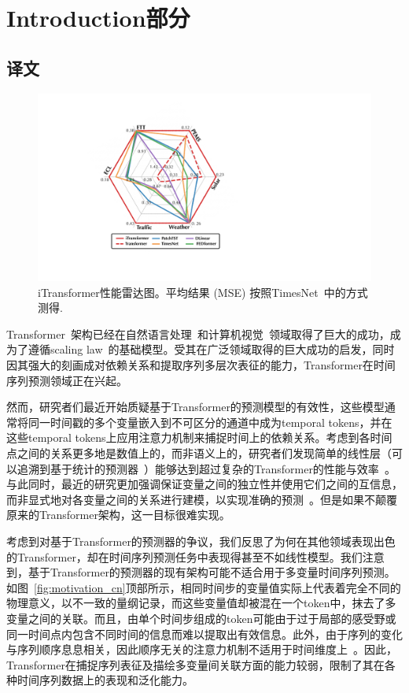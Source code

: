 \documentclass[twoside,12pt]{article}
\begin{document}
\section{Introduction部分}
\subsection{译文}
\begin{figure}[t]
  \begin{center}
    \includegraphics[width=0.5\columnwidth]{pic/radar.pdf}
    \vspace{-10pt}
    \caption{\small{iTransformer性能雷达图。平均结果 (MSE) 按照TimesNet~\citeyearpar{Timesnet}中的方式测得}.}
    \label{fig:radar_cn}
  \end{center}
  \vspace{-14pt}
\end{figure}

Transformer~\citep{Transformer}架构已经在自然语言处理~\citep{brown2020language}和计算机视觉~\citep{dosovitskiy2020image}领域取得了巨大的成功，成为了遵循scaling law~\citep{kaplan2020scaling}的基础模型。受其在广泛领域取得的巨大成功的启发，同时因其强大的刻画成对依赖关系和提取序列多层次表征的能力，Transformer在时间序列预测领域正在兴起。~\citep{Informer, Autoformer, PatchTST}

然而，研究者们最近开始质疑基于Transformer的预测模型的有效性，这些模型通常将同一时间戳的多个变量嵌入到不可区分的通道中成为temporal tokens，并在这些temporal tokens上应用注意力机制来捕捉时间上的依赖关系。考虑到各时间点之间的关系更多地是数值上的，而非语义上的，研究者们发现简单的线性层（可以追溯到基于统计的预测器~\citep{box1968some}）能够达到超过复杂的Transformer的性能与效率~\citep{DLinear, das2023long}。与此同时，最近的研究更加强调保证变量之间的独立性并使用它们之间的互信息，而非显式地对各变量之间的关系进行建模，以实现准确的预测~\citep{DLinear, das2023long}。但是如果不颠覆原来的Transformer架构，这一目标很难实现。

考虑到对基于Transformer的预测器的争议，我们反思了为何在其他领域表现出色的Transformer，却在时间序列预测任务中表现得甚至不如线性模型。我们注意到，基于Transformer的预测器的现有架构可能不适合用于多变量时间序列预测。如图~\ref{fig:motivation_cn}顶部所示，相同时间步的变量值实际上代表着完全不同的物理意义，以不一致的量纲记录，而这些变量值却被混在一个token中，抹去了多变量之间的关联。而且，由单个时间步组成的token可能由于过于局部的感受野或同一时间点内包含不同时间的信息而难以提取出有效信息。此外，由于序列的变化与序列顺序息息相关，因此顺序无关的注意力机制不适用于时间维度上~\citep{DLinear}。因此，Transformer在捕捉序列表征及描绘多变量间关联方面的能力较弱，限制了其在各种时间序列数据上的表现和泛化能力。
\end{document}
